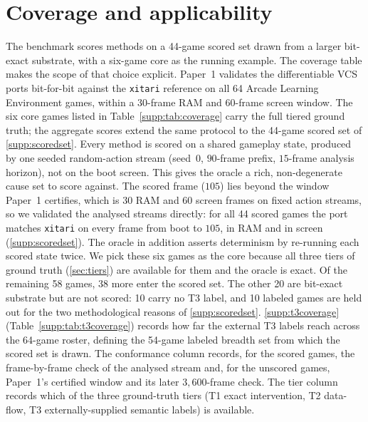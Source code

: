 \section{Coverage and applicability}\label{supp:coverage}

The benchmark scores methods on a 44-game scored set drawn from a larger bit-exact substrate,
with a six-game core as the running example. The coverage table makes the scope of that choice
explicit. Paper~1 validates the
differentiable VCS ports bit-for-bit against the \texttt{xitari} reference on all 64 Arcade
Learning Environment games, within a 30-frame RAM and 60-frame screen window. The
six core games listed in Table~\ref{supp:tab:coverage} carry the full tiered ground truth; the
aggregate scores extend the same protocol to the 44-game scored set of
\Sectionname\ref{supp:scoredset}. Every method is scored on a shared gameplay state, produced by
one seeded random-action stream (seed~$0$, $90$-frame prefix, $15$-frame analysis horizon), not
on the boot screen. This gives the oracle a rich, non-degenerate cause set to score against.
The scored frame ($105$) lies beyond the window Paper~1 certifies, which is $30$ RAM and $60$
screen frames on fixed action streams, so we validated the analysed streams directly: for all 44
scored games the port matches \texttt{xitari} on every frame from boot to $105$, in RAM and in
screen (\Sectionname\ref{supp:scoredset}). The oracle in addition asserts determinism by
re-running each scored state twice. We pick these six games as the core because all
three tiers of ground truth (\Sectionname\ref{sec:tiers}) are available for them and the oracle is
exact. Of the remaining 58 games, 38 more enter the scored set. The other 20 are bit-exact
substrate but are not scored: 10 carry no T3 label, and 10 labeled games are held out for the
two methodological reasons of \Sectionname\ref{supp:scoredset}. \Sectionname\ref{supp:t3coverage}
(Table~\ref{supp:tab:t3coverage}) records how far the external T3 labels reach across the
64-game roster, defining the 54-game labeled breadth set from which the scored set is drawn. The
conformance column records, for the scored games, the frame-by-frame check of the analysed stream
and, for the unscored games, Paper~1's certified window and its later $3{,}600$-frame check. The tier column records which of the three
ground-truth tiers (T1 exact intervention, T2 data-flow, T3 externally-supplied semantic
labels) is available.

